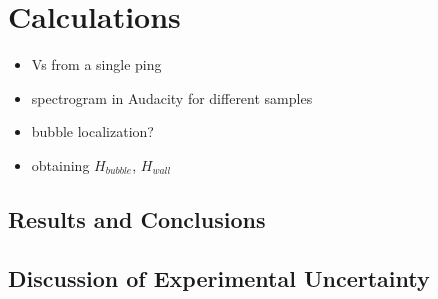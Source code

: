 \section{Calculations}

\begin{itemize}
    \item Vs from a single ping
    \item spectrogram in Audacity for different samples
    \item bubble localization?
    \item obtaining $H_{bubble}$, $H_{wall}$
\end{itemize}


\subsection{Results and Conclusions}



\subsection{Discussion of Experimental Uncertainty}



